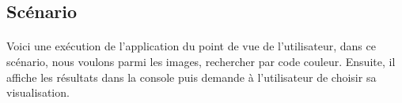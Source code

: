 \documentclass[../main.tex]{subfiles}
\begin{document}
    \subsection{Scénario}
    \paragraph{}
    Voici une exécution de l’application du point de vue de l’utilisateur, dans ce scénario, nous voulons parmi les images, rechercher par code couleur. Ensuite, il affiche les résultats dans la console puis demande à l'utilisateur de choisir sa visualisation.
\end{document}
